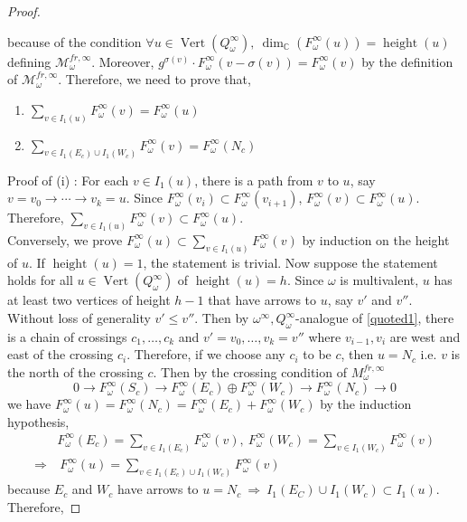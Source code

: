 \begin{proof}
\begin{itemize}
\end{itemize} 
because of the condition $\forall u\in \operatorname{Vert}(Q_\omega^\infty),~\operatorname{dim}_\mathbb{C}(F_\omega^\infty(u)) = \operatorname{height}(u)$ defining $\mathcal{M}_\omega^{fr,\infty}$. Moreover, $g^{\sigma(v)}\cdot F_\omega^\infty(v-\sigma(v)) = F_\omega^\infty(v)$ by the definition of $\mathcal{M}_\omega^{fr,\infty}$. Therefore, we need to prove that, 
\begin{enumerate}[label=(\roman*)]
\item $\sum_{v\in I_1(u)} F_\omega^\infty(v)=F_\omega^\infty(u)$
\item $\sum_{v\in I_1(E_c)\cup I_1(W_c)} F_\omega^\infty(v)=F_\omega^\infty(N_c)$
\end{enumerate}
Proof of (\Rn{1}) : For each $v\in I_1(u)$, there is a path from $v$ to $u$, say $v=v_0 \rightarrow \cdots \rightarrow v_k = u$. Since $F_\omega^\infty(v_i)\subset F_\omega^\infty(v_{i+1})$, $F_\omega^\infty(v)\subset F_\omega^\infty(u)$. Therefore, $\sum_{v\in I_1(u)} F_\omega^\infty(v) \subset F_\omega^\infty(u)$. \\
Conversely, we prove $F_\omega^\infty(u)\subset \sum_{v\in I_1(u)}F_\omega^\infty(v)$ by induction on the height of $u$. If $\operatorname{height}(u)=1$, the statement is trivial. Now suppose the statement holds for all $u\in \operatorname{Vert}(Q_\omega^\infty)$ of $\operatorname{height}(u) = h$. Since $\omega$ is multivalent, $u$ has at least two vertices of height $h-1$ that have arrows to $u$, say $v'$ and $v''$. Without loss of generality $v'\leq v''$. Then by $\omega^\infty, Q_\omega^\infty$-analogue of \ref{quoted1}, there is a chain of crossings $c_1,\dots,c_k$ and $v'=v_0,\dots,v_k=v''$ where $v_{i-1},v_i$ are west and east of the crossing $c_i$. Therefore, if we choose any $c_i$ to be $c$, then $u=N_c$ i.e. $v$ is the north of the crossing $c$. Then by the crossing condition of $M_\omega^{fr,\infty}$
\[
0\rightarrow F_\omega^\infty(S_c)\rightarrow F_\omega^\infty(E_c)\oplus F_\omega^\infty(W_c)\rightarrow F_\omega^\infty(N_c)\rightarrow 0
\]
we have $F_\omega^\infty(u) = F_\omega^\infty(N_c)=F_\omega^\infty(E_c)+F_\omega^\infty(W_c)$ by the induction hypothesis,
\begin{align*}
&F_\omega^\infty(E_c) = \sum_{v\in I_1(E_c)} F_\omega^\infty(v),~F_\omega^\infty(W_c) = \sum_{v\in I_1(W_c)} F_\omega^\infty(v)\\
\Rightarrow &~F_\omega^\infty(u) = \sum_{v\in I_1(E_c)\cup I_1(W_c)} F_\omega^\infty(v)
\end{align*}
because $E_c$ and $W_c$ have arrows to $u=N_c~\Rightarrow~I_1(E_C)\cup I_1(W_c)\subset I_1(u)$. Therefore,

\end{proof}
